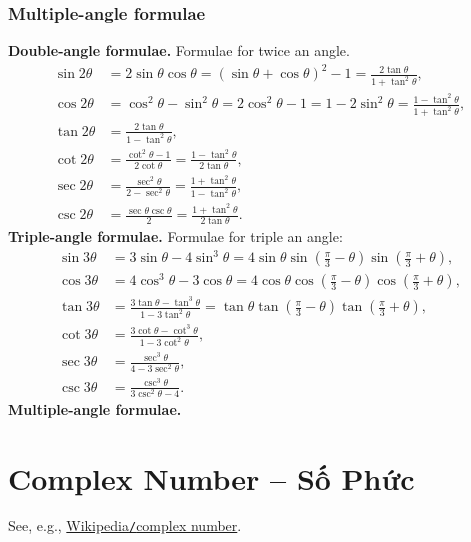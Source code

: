 \documentclass{article}
\begin{document}
\subsubsection{Multiple-angle formulae}
{\bf Double-angle formulae.} Formulae for twice an angle.
\begin{align*}
	\sin2\theta &= 2\sin\theta\cos\theta = (\sin\theta + \cos\theta)^2 - 1 = \frac{2\tan\theta}{1 + \tan^2\theta},\\
	\cos2\theta &= \cos^2\theta - \sin^2\theta = 2\cos^2\theta - 1 = 1 - 2\sin^2\theta = \frac{1 - \tan^2\theta}{1 + \tan^2\theta},\\
	\tan2\theta &= \frac{2\tan\theta}{1 - \tan^2\theta},\\
	\cot2\theta &= \frac{\cot^2\theta - 1}{2\cot\theta} = \frac{1 - \tan^2\theta}{2\tan\theta},\\
	\sec2\theta &= \frac{\sec^2\theta}{2 - \sec^2\theta} = \frac{1 + \tan^2\theta}{1 - \tan^2\theta},\\
	\csc2\theta &= \frac{\sec\theta\csc\theta}{2} = \frac{1 + \tan^2\theta}{2\tan\theta}.
\end{align*}
{\bf Triple-angle formulae.} Formulae for triple an angle:
\begin{align*}
	\sin3\theta &= 3\sin\theta - 4\sin^3\theta = 4\sin\theta\sin\left(\frac{\pi}{3} - \theta\right)\sin\left(\frac{\pi}{3} + \theta\right),\\
	\cos3\theta &= 4\cos^3\theta - 3\cos\theta = 4\cos\theta\cos\left(\frac{\pi}{3} - \theta\right)\cos\left(\frac{\pi}{3} + \theta\right),\\
	\tan3\theta &= \frac{3\tan\theta - \tan^3\theta}{1 - 3\tan^2\theta} = \tan\theta\tan\left(\frac{\pi}{3} - \theta\right)\tan\left(\frac{\pi}{3} + \theta\right),\\
	\cot3\theta &= \frac{3\cot\theta - \cot^3\theta}{1 - 3\cot^2\theta},\\
	\sec3\theta &= \frac{\sec^3\theta}{4 - 3\sec^2\theta},\\
	\csc3\theta &= \frac{\csc^3\theta}{3\csc^2\theta - 4}.
\end{align*}
{\bf Multiple-angle formulae.}


\section{Complex Number -- Số Phức}
See, e.g., \href{https://en.wikipedia.org/wiki/Complex_number}{Wikipedia{\tt/}complex number}.
\end{document}
